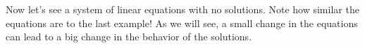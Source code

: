 \documentclass{ximera}
\begin{document}
\begin{example}
\begin{explanation}
\end{explanation}
\end{example}

Now let's see a system of linear equations with no solutions. Note how similar the equations are to the last example! As we will see, a small change in the equations can lead to a big change in the behavior of the solutions.
\end{document}

